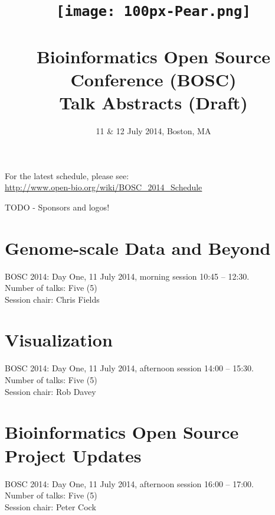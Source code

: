\documentclass[10pt,oneside]{article}
\title{%
\vspace{4cm}
\texttt{[image: 100px-Pear.png]}\\
~\\Bioinformatics Open Source Conference (BOSC)\\
Talk Abstracts (Draft)}
\date{11 \& 12 July 2014, Boston, MA}
\begin{document}
\pagestyle{empty}
\maketitle

\noindent For the latest schedule, please see:\\
\url{http://www.open-bio.org/wiki/BOSC_2014_Schedule}

TODO - Sponsors and logos!

\thispagestyle{empty}

\newpage
\section*{Genome-scale Data and Beyond}
BOSC 2014: Day One, 11 July 2014, morning session 10:45 -- 12:30. \\
\noindent Number of talks: Five (5) \\
\noindent Session chair: Chris Fields






\newpage
\section*{Visualization}
BOSC 2014: Day One, 11 July 2014, afternoon session 14:00 -- 15:30. \\
\noindent Number of talks: Five (5) \\
\noindent Session chair: Rob Davey 






\newpage
\section*{Bioinformatics Open Source Project Updates}
BOSC 2014: Day One, 11 July 2014, afternoon session 16:00 -- 17:00. \\
\noindent Number of talks: Five (5) \\
\noindent Session chair: Peter Cock 





\end{document}
